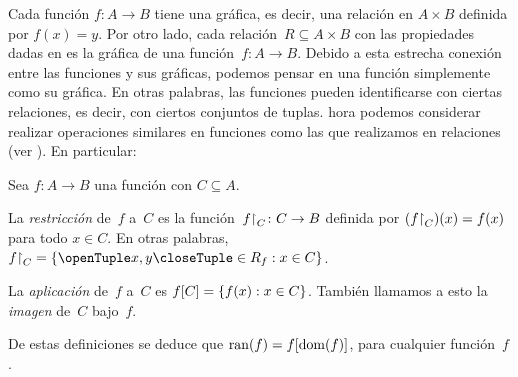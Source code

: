 \documentclass[../../../include/open-logic-section]{subfiles}
\begin{document}
\begin{explain}
Cada función $f\colon A \to B$ tiene una gráfica, es decir, una relación en $A
\times B$ definida por $f(x) = y$. Por otro lado, cada relación~$R
\subseteq A \times B$ con las propiedades dadas en
 es la gráfica de una función~$f \colon A \to
B$. Debido a esta estrecha conexión entre las funciones y sus
gráficas, podemos pensar en una función simplemente como su gráfica. En otras
palabras, las funciones pueden identificarse con ciertas relaciones, es decir, con
ciertos conjuntos de tuplas. hora podemos considerar realizar operaciones similares en
funciones como las que realizamos en relaciones (ver
). En particular:
\end{explain}

\begin{defn}
Sea $f \colon A \to B$ una función con $C\subseteq A$.

La \emph{restricción} de~$f$ a~$C$ es la
función~$f\mathord{\restriction}_{C}\colon C \to B$ definida por
$(f\mathord{\restriction}_{C})(x) = f(x)$ para todo $x \in C$. En otras
palabras, $\funrestrictionto{f}{C} = \Setabs{\tuple{x, y} \in R_f}{x \in
C}$.

La \emph{aplicación} de~$f$ a~$C$ es $f[C] =
\{ f(x) : x \in C \}$. También llamamos a esto la \emph{imagen} de~$C$
bajo~$f$.
\end{defn}

\begin{explain}
De estas definiciones se deduce que $\mathrm{ran}(f) =
f[\mathrm{dom}(f)]$, para cualquier función~$f$.
\end{explain}
\end{document}
